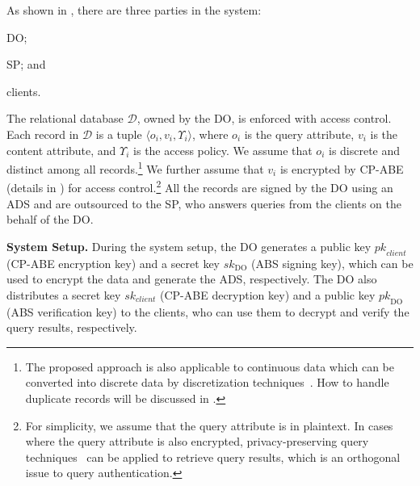 As shown in , there are three parties in the system:
\begin{inlineenum}
\item DO\@;
\item SP\@; and
\item clients.
\end{inlineenum}
The relational database $\mathcal{D}$, owned by the DO, is enforced with access control. Each  record in $\mathcal{D}$ is a tuple $\langle o_i, v_i, \Upsilon_i\rangle$, where $o_i$ is the query attribute, $v_i$ is the content attribute, and $\Upsilon_i$ is the access policy. We assume that $o_i$ is discrete and distinct among all records.\footnote{The proposed approach is also applicable to continuous data which can be converted into discrete data by discretization techniques~\cite{Kotsiantis2006}. How to handle duplicate records will be discussed in .}  We further assume that $v_i$ is encrypted by CP-ABE~\cite{10.1109/sp.2007.11} (details in ) for access control.\footnote{For simplicity, we assume that the query attribute is in plaintext. In cases where the query attribute is also encrypted,
privacy-preserving query techniques~\cite{10.1145/2699026.2699101} can be applied to retrieve query results, which is an orthogonal issue to query authentication.}
All the records are signed by the DO using an ADS and are outsourced to the SP, who answers queries from the clients on the behalf of the DO\@.

\textbf{System Setup.}
During the system setup, the DO generates a public key ${pk}_{client}$ (CP-ABE encryption key) and a secret key ${sk}_\text{DO}$ (ABS signing key), which can be used to encrypt the data and generate the ADS, respectively. The DO also distributes a secret key ${sk}_{client}$ (CP-ABE decryption key) and a public key ${pk}_\text{DO}$ (ABS verification key) to the clients, who can use them to decrypt and verify the query results, respectively.

